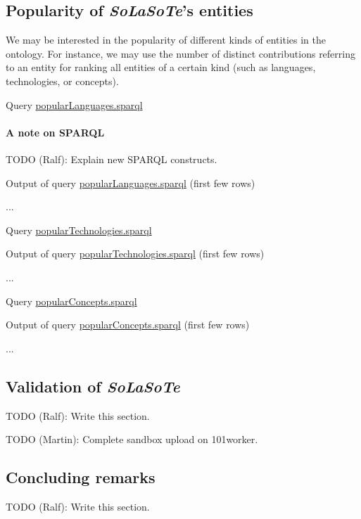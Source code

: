 \documentclass{article}
\newcommand{\todo}[2]{\noindent{}TODO (#1): #2}
\newcommand{\solasote}{{\itshape\textsf{SoLaSoTe}}}
\newcommand{\sparqlnote}[1]{
\paragraph{A note on SPARQL} #1
}
\newcommand{\sparql}[1]{%
\medskip

\noindent
\begin{boxedminipage}{\hsize}
\hfill{}Query \underline{#1.sparql}

\end{boxedminipage}
\medskip
}
\newcommand{\partialOutput}[2]{%

\medskip

\noindent
\begin{boxedminipage}{\hsize}
\hfill{}Output of query \underline{#2.sparql} (first few rows)

{\large{}...}
\end{boxedminipage}
\medskip
}
\begin{document}
\subsection{Popularity of \solasote's entities}

We may be interested in the popularity of different kinds of entities
in the ontology. For instance, we may use the number of distinct
contributions referring to an entity for ranking all entities of a
certain kind (such as languages, technologies, or concepts). 

\sparql{popularLanguages}

\sparqlnote{\todo{Ralf}{Explain new SPARQL constructs.}}

\partialOutput{7}{popularLanguages}

\sparql{popularTechnologies}

\partialOutput{7}{popularTechnologies}

\sparql{popularConcepts}

\partialOutput{7}{popularConcepts}


\subsection{Validation of \solasote}

\todo{Ralf}{Write this section.}

\todo{Martin}{Complete sandbox upload on 101worker.}


\subsection{Concluding remarks}

\todo{Ralf}{Write this section.}


\begin{comment}

























\end{comment}
\end{document}
